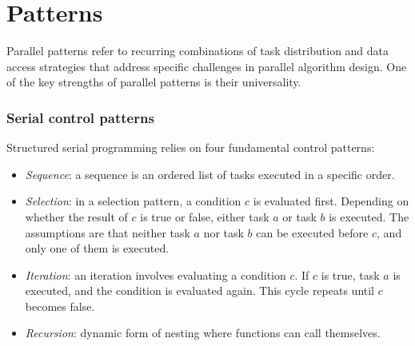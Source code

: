 \section{Patterns}

Parallel patterns refer to recurring combinations of task distribution and data access strategies that address specific challenges in parallel algorithm design. 
One of the key strengths of parallel patterns is their universality.

\subsubsection{Serial control patterns}
Structured serial programming relies on four fundamental control patterns:
\begin{itemize}
    \item \textit{Sequence}: a sequence is an ordered list of tasks executed in a specific order. 
    \item \textit{Selection}: in a selection pattern, a condition $c$ is evaluated first. 
        Depending on whether the result of $c$ is true or false, either task $a$ or task $b$ is executed. 
        The assumptions are that neither task $a$ nor task $b$ can be executed before $c$, and only one of them is executed.
    \item \textit{Iteration}: an iteration involves evaluating a condition $c$. 
        If $c$ is true, task $a$ is executed, and the condition is evaluated again. 
        This cycle repeats until $c$ becomes false. 
    \item \textit{Recursion}: dynamic form of nesting where functions can call themselves. 
\end{itemize}

